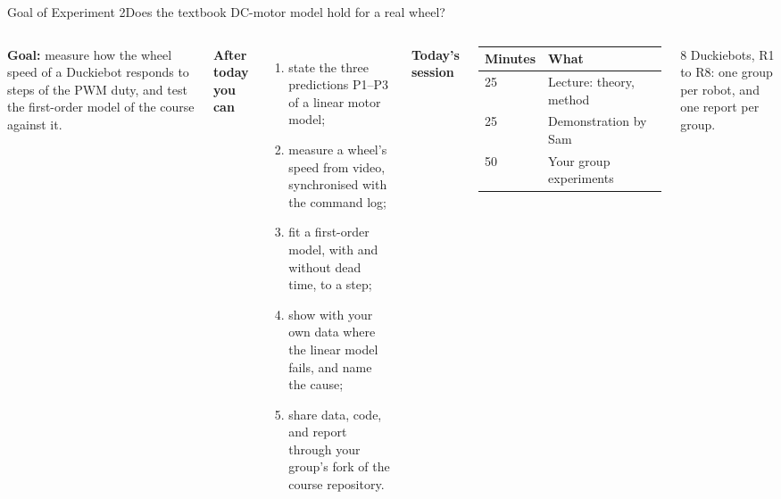 %
\begin{frame}{Goal of Experiment 2}{Does the textbook DC-motor model hold for a real wheel?}
  \footnotesize
  \begin{columns}[T]
    \textbf{Goal:} measure how the wheel speed of a Duckiebot responds to \alert{steps of the PWM duty}, and test the first-order model of the course against it.

    \vspace{4pt}
    \textbf{After today you can}
    \scriptsize
    \begin{enumerate}\setlength{\itemsep}{1pt}
      \item state the three predictions P1--P3 of a linear motor model;
      \item measure a wheel's speed from video, synchronised with the command log;
      \item fit a first-order model, with and without dead time, to a step;
      \item show with your own data where the linear model fails, and name the cause;
      \item share data, code, and report through your group's fork of the course repository.
    \end{enumerate}
    \textbf{Today's session}

    \vspace{2pt}
    \begin{tabular}{@{}ll@{}}
      \toprule
      Minutes & What \\
      \midrule
      25 & Lecture: theory, method \\
      25 & Demonstration by Sam \\
      50 & Your group experiments \\
      \bottomrule
    \end{tabular}

    \vspace{6pt}
    8 Duckiebots, R1 to R8: \alert{one group per robot}, and one report per group.
  \end{columns}
\end{frame}
